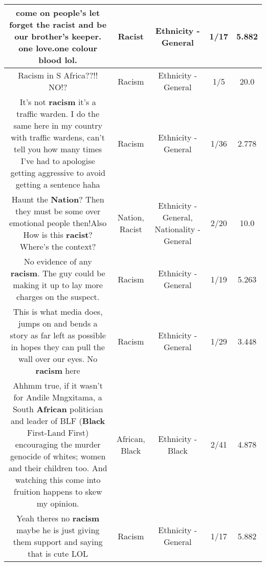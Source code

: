 \documentclass[11pt]{article}
\newlength\mylength
\begin{document}
\begin{center}
\begin{longtable}{|C{.65\mylength}|C{.30\mylength}|C{.12\mylength}|C{.12\mylength}|C{.12\mylength}|}
  \small come on people's  let forget  the \textbf{racist} and be our brother's keeper. one  love.one colour blood lol.\normalsize   & Racist & Ethnicity - General & 1/17 & 5.882 \\  \hline
  \small Racism in S Africa??!! NO!?\normalsize   & Racism & Ethnicity - General & 1/5 & 20.0 \\  \hline
  \small It's not \textbf{racism} it's a traffic warden. I do the same here in my country with traffic wardens, can't tell you how many times I've had to apologise getting aggressive to avoid getting a sentence haha\normalsize   & Racism & Ethnicity - General & 1/36 & 2.778 \\  \hline
  \small Haunt the \textbf{Nation}? Then they must be some over emotional people then!Also How is this \textbf{racist}? Where's the context?\normalsize   & Nation, Racist & Ethnicity - General, Nationality - General & 2/20 & 10.0 \\  \hline
  \small No evidence of any \textbf{racism}. The guy could be making it up to lay more charges on the suspect.\normalsize   & Racism & Ethnicity - General & 1/19 & 5.263 \\  \hline
  \small This is what media does, jumps on and bends a story as far left as possible in hopes they can pull the wall over our eyes. No \textbf{racism} here\normalsize   & Racism & Ethnicity - General & 1/29 & 3.448 \\  \hline
  \small Ahhmm true, if it wasn't for Andile Mngxitama, a South \textbf{African} politician  and leader of BLF (\textbf{Black} First-Land First) encouraging the murder genocide of whites; women and their children too. And watching this come into fruition happens to skew my opinion.\normalsize   & African, Black & Ethnicity - Black & 2/41 & 4.878 \\  \hline
  \small Yeah theres no \textbf{racism} maybe he is just giving them support  and saying that is cute LOL\normalsize   & Racism & Ethnicity - General & 1/17 & 5.882 \\  \hline

\end{longtable}
\end{center}
\end{document}
